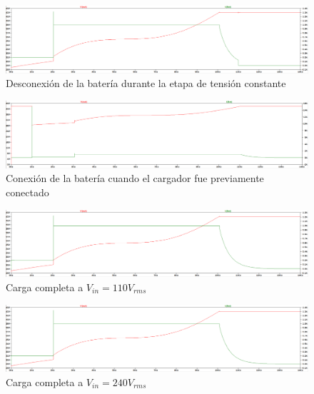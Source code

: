 \begin{figure}
    \centering
    \includegraphics[width=\textwidth]{images/desconexion_CV.png}
    \caption{Desconexión de la batería durante la etapa de tensión constante}
    \label{fig:desconexion_CV}
\end{figure}

\begin{figure}
    \centering
    \includegraphics[width=\textwidth]{images/conexion.png}
    \caption{Conexión de la batería cuando el cargador fue previamente conectado}
    \label{fig:conexion}
\end{figure}

\begin{figure}
    \centering
    \includegraphics[width=\textwidth]{images/110V_1A.png}
    \caption{Carga completa a $V_{in}=110V_{rms}$}
    \label{fig:110V_1A}
\end{figure}

\begin{figure}
    \centering
    \includegraphics[width=\textwidth]{images/240V_1A.png}
    \caption{Carga completa a $V_{in}=240V_{rms}$}
    \label{fig:240V_1A}
\end{figure}

